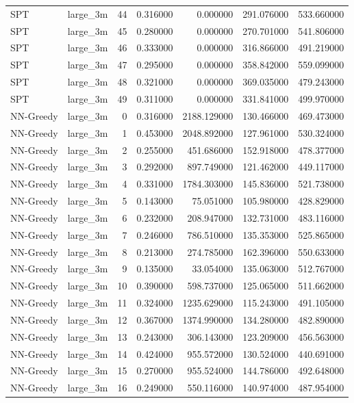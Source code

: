 \begin{tabular}{llrrrrr}
SPT & large_3m & 44 & 0.316000 & 0.000000 & 291.076000 & 533.660000 \\
SPT & large_3m & 45 & 0.280000 & 0.000000 & 270.701000 & 541.806000 \\
SPT & large_3m & 46 & 0.333000 & 0.000000 & 316.866000 & 491.219000 \\
SPT & large_3m & 47 & 0.295000 & 0.000000 & 358.842000 & 559.099000 \\
SPT & large_3m & 48 & 0.321000 & 0.000000 & 369.035000 & 479.243000 \\
SPT & large_3m & 49 & 0.311000 & 0.000000 & 331.841000 & 499.970000 \\
NN-Greedy & large_3m & 0 & 0.316000 & 2188.129000 & 130.466000 & 469.473000 \\
NN-Greedy & large_3m & 1 & 0.453000 & 2048.892000 & 127.961000 & 530.324000 \\
NN-Greedy & large_3m & 2 & 0.255000 & 451.686000 & 152.918000 & 478.377000 \\
NN-Greedy & large_3m & 3 & 0.292000 & 897.749000 & 121.462000 & 449.117000 \\
NN-Greedy & large_3m & 4 & 0.331000 & 1784.303000 & 145.836000 & 521.738000 \\
NN-Greedy & large_3m & 5 & 0.143000 & 75.051000 & 105.980000 & 428.829000 \\
NN-Greedy & large_3m & 6 & 0.232000 & 208.947000 & 132.731000 & 483.116000 \\
NN-Greedy & large_3m & 7 & 0.246000 & 786.510000 & 135.353000 & 525.865000 \\
NN-Greedy & large_3m & 8 & 0.213000 & 274.785000 & 162.396000 & 550.633000 \\
NN-Greedy & large_3m & 9 & 0.135000 & 33.054000 & 135.063000 & 512.767000 \\
NN-Greedy & large_3m & 10 & 0.390000 & 598.737000 & 125.065000 & 511.662000 \\
NN-Greedy & large_3m & 11 & 0.324000 & 1235.629000 & 115.243000 & 491.105000 \\
NN-Greedy & large_3m & 12 & 0.367000 & 1374.990000 & 134.280000 & 482.890000 \\
NN-Greedy & large_3m & 13 & 0.243000 & 306.143000 & 123.209000 & 456.563000 \\
NN-Greedy & large_3m & 14 & 0.424000 & 955.572000 & 130.524000 & 440.691000 \\
NN-Greedy & large_3m & 15 & 0.270000 & 955.524000 & 144.786000 & 492.648000 \\
NN-Greedy & large_3m & 16 & 0.249000 & 550.116000 & 140.974000 & 487.954000 \\

\end{tabular}
